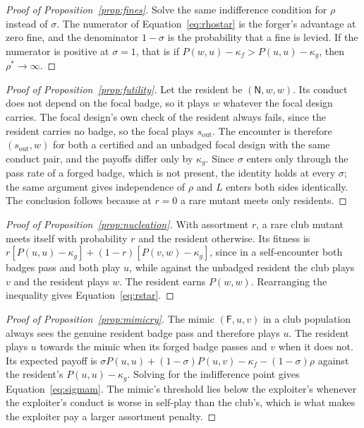 \documentclass[11pt,a4paper]{article}
\begin{document}
\begin{proof}[Proof of Proposition~\ref{prop:fines}]
Solve the same indifference condition for $\rho$ instead of $\sigma$. The
numerator of Equation~\eqref{eq:rhostar} is the forger's advantage at zero
fine, and the denominator $1 - \sigma$ is the probability that a fine is
levied. If the numerator is positive at $\sigma = 1$, that is if
$P(w,u) - \kappa_f > P(u,u) - \kappa_g$, then $\rho^{*} \to \infty$.
\end{proof}

\begin{proof}[Proof of Proposition~\ref{prop:futility}]
Let the resident be $(\mathsf{N}, w, w)$. Its conduct does not depend on the
focal badge, so it plays $w$ whatever the focal design carries. The focal
design's own check of the resident always fails, since the resident carries no
badge, so the focal plays $s_{\mathrm{out}}$. The encounter is therefore
$(s_{\mathrm{out}}, w)$ for both a certified and an unbadged focal design with
the same conduct pair, and the payoffs differ only by $\kappa_g$. Since
$\sigma$ enters only through the pass rate of a forged badge, which is not
present, the identity holds at every $\sigma$; the same argument gives
independence of $\rho$ and $L$ enters both sides identically. The conclusion
follows because at $r = 0$ a rare mutant meets only residents.
\end{proof}

\begin{proof}[Proof of Proposition~\ref{prop:nucleation}]
With assortment $r$, a rare club mutant meets itself with probability $r$ and
the resident otherwise. Its fitness is
$r[P(u,u) - \kappa_g] + (1-r)[P(v,w) - \kappa_g]$, since in a self-encounter
both badges pass and both play $u$, while against the unbadged resident the
club plays $v$ and the resident plays $w$. The resident earns $P(w,w)$.
Rearranging the inequality gives Equation~\eqref{eq:rstar}.
\end{proof}

\begin{proof}[Proof of Proposition~\ref{prop:mimicry}]
The mimic $(\mathsf{F}, u, v)$ in a club population always sees the genuine
resident badge pass and therefore plays $u$. The resident plays $u$ towards
the mimic when its forged badge passes and $v$ when it does not.
Its expected payoff is $\sigma P(u,u) + (1-\sigma) P(u,v) - \kappa_f -
(1-\sigma)\rho$ against the resident's $P(u,u) - \kappa_g$. Solving for the
indifference point gives Equation~\eqref{eq:sigmam}. The mimic's threshold lies
below the exploiter's whenever the exploiter's conduct is worse in self-play
than the club's, which is what makes the exploiter pay a larger assortment
penalty.
\end{proof}
\end{document}
